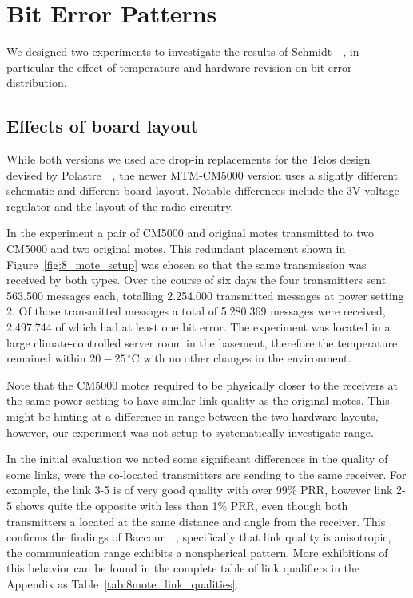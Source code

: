 \section{Bit Error Patterns}

We designed two experiments to investigate the results of Schmidt~\etal~\cite{Schmidt2013}, in particular the effect of temperature and hardware revision on bit error distribution.

\subsection{Effects of board layout}
\label{subsec:effects_of_board_layout}

While both versions we used are drop-in replacements for the Telos design devised by Polastre~\etal~\cite{Polastre2005}, the newer MTM-CM5000 version uses a slightly different schematic and different board layout.
Notable differences include the 3V voltage regulator and the layout of the radio circuitry.

In the experiment a pair of CM5000 and original motes transmitted to two CM5000 and two original motes.
This redundant placement shown in Figure~\ref{fig:8_mote_setup} was chosen so that the same transmission was received by both types.
Over the course of six days the four transmitters sent 563.500 messages each, totalling 2.254.000 transmitted messages at power setting 2. Of those transmitted messages a total of 5.280.369 messages were received, 2.497.744 of which had at least one bit error.
The experiment was located in a large climate-controlled server room in the basement, therefore the temperature remained within $20-25\,^{\circ}\mathrm{C}$ with no other changes in the environment.

Note that the CM5000 motes required to be physically closer to the receivers at the same power setting to have similar link quality as the original motes.
This might be hinting at a difference in range between the two hardware layouts, however, our experiment was not setup to systematically investigate range.

In the initial evaluation we noted some significant differences in the quality of some links, were the co-located transmitters are sending to the same receiver.
For example, the link 3-5 is of very good quality with over 99\% PRR, however link 2-5 shows quite the opposite with less than 1\% PRR, even though both transmitters a located at the same distance and angle from the receiver.
This confirms the findings of Baccour~\etal~\cite{Baccour2012}, specifically that link quality is anisotropic, \ie the communication range exhibits a nonspherical pattern.
More exhibitions of this behavior can be found in the complete table of link qualifiers in the Appendix as Table~\ref{tab:8mote_link_qualities}.

